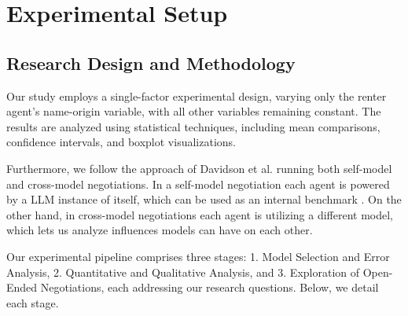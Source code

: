 \documentclass[runningheads]{llncs}
\begin{document}
\section{Experimental Setup}

\subsection{Research Design and Methodology}

Our study employs a single-factor experimental design, varying only the renter agent's name-origin variable, with all other variables remaining constant. The results are analyzed using statistical techniques, including mean comparisons, confidence intervals, and boxplot visualizations. 



Furthermore, we follow the approach of Davidson et al. \cite{davidson_evaluating_2024} running both self-model and cross-model negotiations. In a self-model negotiation each agent is powered by a LLM instance of itself, which can be used as an internal benchmark \cite[p.~4]{davidson_evaluating_2024}. On the other hand, in cross-model negotiations each agent is utilizing a different model, which lets us analyze influences models can have on each other.

Our experimental pipeline comprises three stages: 1. Model Selection and Error Analysis, 2. Quantitative and Qualitative Analysis, and 3. Exploration of Open-Ended Negotiations, each addressing our research questions. Below, we detail each stage.
\end{document}
